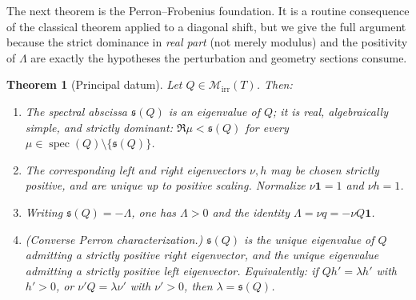 \documentclass[11pt,reqno]{amsart}
\theoremstyle{plain}
\newtheorem{theorem}{Theorem}[section]
\theoremstyle{definition}
\theoremstyle{remark}
\newcommand{\one}{\mathbf{1}}
\newcommand{\abscissa}{\mathfrak{s}}
\DeclareMathOperator{\spec}{spec}
\begin{document}
The next theorem is the Perron--Frobenius foundation. It is a routine consequence
of the classical theorem applied to a diagonal shift, but we give the full
argument because the strict dominance in \emph{real part} (not merely modulus) and
the positivity of $\Lambda$ are exactly the hypotheses the perturbation and
geometry sections consume.

\begin{theorem}[Principal datum]\label{thm:pf}
Let $Q\in\mathcal M_{\mathrm{irr}}(T)$. Then:
\begin{enumerate}[label=\textup{(\roman*)}]
\item The spectral abscissa $\abscissa(Q)$ is an eigenvalue of $Q$; it is real,
algebraically simple, and \emph{strictly dominant}: $\Re\mu<\abscissa(Q)$ for every
$\mu\in\spec(Q)\setminus\{\abscissa(Q)\}$.
\item The corresponding left and right eigenvectors $\nu,h$ may be chosen strictly
positive, and are unique up to positive scaling. Normalize $\nu\one=1$ and
$\nu h=1$.
\item Writing $\abscissa(Q)=-\Lambda$, one has $\Lambda>0$ and the identity
$\Lambda=\nu q=-\nu Q\one$.
\item \textup{(Converse Perron characterization.)} $\abscissa(Q)$ is the unique
eigenvalue of $Q$ admitting a strictly positive right eigenvector, and the unique
eigenvalue admitting a strictly positive left eigenvector. Equivalently: if
$Qh'=\lambda h'$ with $h'>0$, or $\nu'Q=\lambda\nu'$ with $\nu'>0$, then
$\lambda=\abscissa(Q)$.
\end{enumerate}
\end{theorem}
\end{document}
